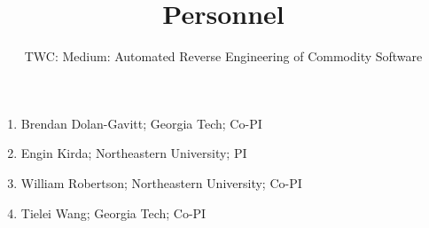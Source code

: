 \documentclass[letterpaper,11pt]{scrartcl}
\newcommand{\thetitle}{TWC: Medium: Automated Reverse Engineering of Commodity Software\xspace}
\begin{document}
\title{Personnel}
\subtitle{\thetitle}
\author{}
\date{}
\maketitle

\begin{enumerate}
    \item Brendan Dolan-Gavitt; Georgia Tech; Co-PI
    \item Engin Kirda; Northeastern University; PI
    \item William Robertson; Northeastern University; Co-PI
    \item Tielei Wang; Georgia Tech; Co-PI
\end{enumerate}
\end{document}
